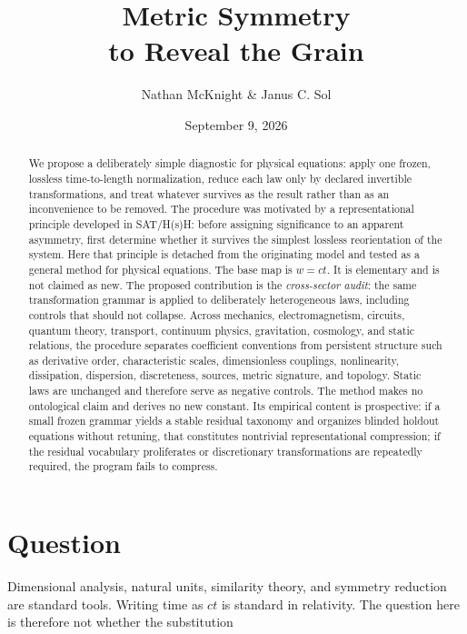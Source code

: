 \documentclass[10pt]{article}
\title{
  \vspace{-2.0em}
  \textbf{Metric Symmetry}\\[-0.1em]
  \large to Reveal the Grain
}
\author{Nathan McKnight \& Janus C. Sol}
\date{September 9, 2026}
\begin{document}
\maketitle
\vspace{-1.3em}

\begin{abstract}
We propose a deliberately simple diagnostic for physical equations:
apply one frozen, lossless time-to-length normalization, reduce each
law only by declared invertible transformations, and treat whatever
survives as the result rather than as an inconvenience to be removed. The procedure was motivated by a representational principle developed in SAT/H(s)H: before assigning significance to an apparent asymmetry, first determine whether it survives the simplest lossless reorientation of the system. Here that principle is detached from the originating model and tested as a general method for physical equations.
The base map is \(w=ct\). It is elementary and is not claimed as new.
The proposed contribution is the \emph{cross-sector audit}: the same
transformation grammar is applied to deliberately heterogeneous laws,
including controls that should not collapse. Across mechanics,
electromagnetism, circuits, quantum theory, transport, continuum
physics, gravitation, cosmology, and static relations, the procedure
separates coefficient conventions from persistent structure such as
derivative order, characteristic scales, dimensionless couplings,
nonlinearity, dissipation, dispersion, discreteness, sources, metric
signature, and topology. Static laws are unchanged and therefore
serve as negative controls. The method makes no ontological claim and
derives no new constant. Its empirical content is prospective: if a
small frozen grammar yields a stable residual taxonomy and organizes
blinded holdout equations without retuning, that constitutes
nontrivial representational compression; if the residual vocabulary
proliferates or discretionary transformations are repeatedly
required, the program fails to compress.
\end{abstract}

\section{Question}

Dimensional analysis, natural units, similarity theory, and symmetry
reduction are standard tools. Writing time as \(ct\) is standard in
relativity. The question here is therefore not whether the
substitution
\end{document}

